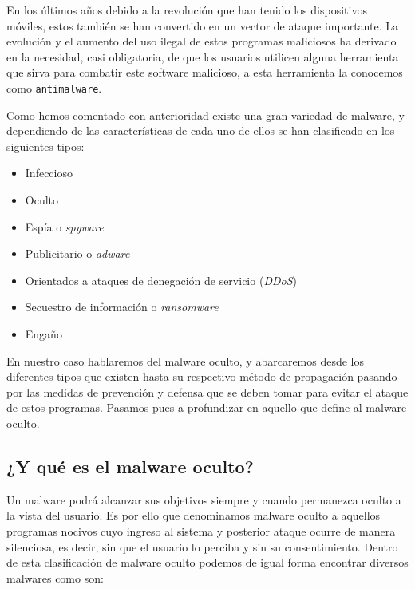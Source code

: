 \documentclass[12pt]{article}
\newcommand{\newpar} {
    \vskip 0.5cm
}
\begin{document}
        \newpar

        En los últimos años debido a la revolución que han tenido los dispositivos móviles, estos también se han convertido en un vector de ataque importante. La evolución y el aumento del uso ilegal de estos programas maliciosos ha derivado en la necesidad, casi obligatoria, de que los usuarios utilicen alguna herramienta que sirva para combatir este software malicioso, a esta herramienta la conocemos como \texttt{antimalware}.

        \newpar

        Como hemos comentado con anterioridad existe una gran variedad de malware, y dependiendo de las características de cada uno de ellos se han clasificado en los siguientes tipos:
        
        \begin{itemize}
            \item Infeccioso
            \item Oculto
            \item Espía o \textit{spyware}
            \item Publicitario o \textit{adware}
            \item Orientados a ataques de denegación de servicio (\textit{DDoS})
            \item Secuestro de información o \textit{ransomware}
            \item Engaño 
        \end{itemize}

        \newpar

        En nuestro caso hablaremos del malware oculto, y abarcaremos desde los diferentes tipos que existen hasta su respectivo método de propagación pasando por las medidas de prevención y defensa que se deben tomar para evitar el ataque de estos programas. Pasamos pues a profundizar en aquello que define al malware oculto.

        \subsection{¿Y qué es el malware oculto?}
            Un malware podrá alcanzar sus objetivos siempre y cuando permanezca oculto a la vista del usuario. Es por ello que denominamos malware oculto a aquellos programas nocivos cuyo ingreso al sistema y posterior ataque ocurre de manera silenciosa, es decir, sin que el usuario lo perciba y sin su consentimiento. Dentro de esta clasificación de malware oculto podemos de igual forma encontrar diversos malwares como son:
\end{document}
